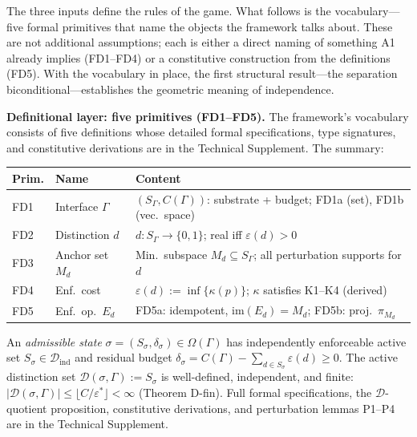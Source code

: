 \documentclass[11pt]{article}
\theoremstyle{remark}
\begin{document}
\smallskip\noindent The three inputs define the rules of the game.  What follows is the vocabulary---five formal primitives that name the objects the framework talks about.  These are not additional assumptions; each is either a direct naming of something A1 already implies (FD1--FD4) or a constitutive construction from the definitions (FD5).  With the vocabulary in place, the first structural result---the separation biconditional---establishes the geometric meaning of independence.

\medskip\noindent\textbf{Definitional layer: five primitives (FD1--FD5).}
The framework's vocabulary consists of five definitions whose detailed formal specifications, type signatures, and constitutive derivations are in the Technical Supplement.  The summary:

\smallskip
\begin{tabular*}{\textwidth}{@{\extracolsep{\fill}}lll@{}}
\textbf{Prim.} & \textbf{Name} & \textbf{Content} \\[2pt]
\hline\noalign{\smallskip}
FD1 & Interface $\Gamma$ & $(S_\Gamma, C(\Gamma))$: substrate + budget; FD1a (set), FD1b (vec.\ space) \\[3pt]
FD2 & Distinction $d$ & $d: S_\Gamma \to \{0,1\}$; real iff $\varepsilon(d) > 0$ \\[3pt]
FD3 & Anchor set $M_d$ & Min.\ subspace $M_d \subseteq S_\Gamma$; all perturbation supports for $d$ \\[3pt]
FD4 & Enf.\ cost & $\varepsilon(d) := \inf\{\kappa(p)\}$; $\kappa$ satisfies K1--K4 (derived) \\[3pt]
FD5 & Enf.\ op.\ $E_d$ & FD5a: idempotent, $\mathrm{im}(E_d)\!=\!M_d$; FD5b: proj.\ $\pi_{M_d}$ \\
\end{tabular*}

\label{box:formal_spec}%
\label{prop:D_quotient_forced}%
\label{prop:FD1_derived}%
\label{prop:FD4_constitutive}%
\label{defn:Dsigma}%
\label{prop:meas}

\smallskip\noindent An \emph{admissible state} $\sigma = (S_\sigma, \delta_\sigma) \in \Omega(\Gamma)$ has independently enforceable active set $S_\sigma \in \mathcal{D}_{\mathrm{ind}}$ and residual budget $\delta_\sigma = C(\Gamma) - \sum_{d \in S_\sigma} \varepsilon(d) \ge 0$.  The active distinction set $\mathcal{D}(\sigma,\Gamma) := S_\sigma$ is well-defined, independent, and finite: $|\mathcal{D}(\sigma,\Gamma)| \le \lfloor C/\varepsilon^* \rfloor < \infty$ (Theorem D-fin).  Full formal specifications, the $\mathcal{D}$-quotient proposition, constitutive derivations, and perturbation lemmas P1--P4 are in the Technical Supplement.
\end{document}
